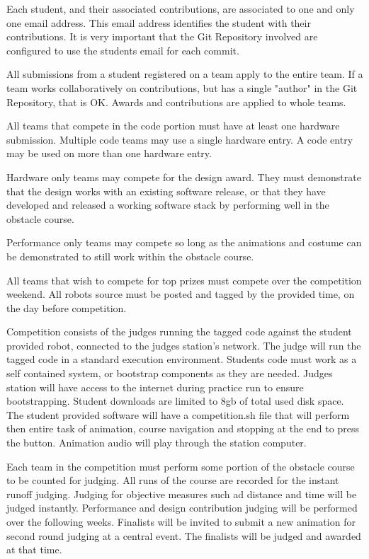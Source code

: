 \documentclass{article}
\begin{document}
Each student, and their associated contributions, are associated to one and only one email address. This email address identifies the student with their contributions. It is very important that the Git Repository involved are configured to use the students email for each commit. 

All submissions from a student registered on a team apply to the entire team. If a team works collaboratively on contributions, but has a single "author" in the Git Repository, that is OK. Awards and contributions are applied to whole teams. 

All teams that compete in the code portion must have at least one hardware submission. Multiple code teams may use a single hardware entry. A code entry may be used on more than one hardware entry. 

Hardware only teams may compete for the design award. They must demonstrate that the design works with an existing software release, or that they have developed and released a working software stack by performing well in the obstacle course. 

Performance only teams may compete so long as the animations and costume can be demonstrated to still work within the obstacle course. 

All teams that wish to compete for top prizes must compete over the competition weekend. All robots source must be posted and tagged by the provided time, on the day before competition. 

Competition consists of the judges running the tagged code against the student provided robot, connected to the judges station's network. The judge will run the tagged code in a standard execution environment. Students code must work as a self contained system, or bootstrap components as they are needed. Judges station will have access to the internet during practice run to ensure bootstrapping. Student downloads are limited to 8gb of total used disk space. The student provided software will have a competition.sh file that will perform then entire task of animation, course navigation and stopping at the end to press the button. Animation audio will play through the station computer. 

Each team in the competition must perform some portion of the obstacle course to be counted for judging. All runs of the course are recorded for the instant runoff judging. Judging for objective measures such ad distance and time will be judged instantly. Performance and design contribution judging will be performed over the following weeks. Finalists will be invited to submit a new animation for second round judging at a central event. The finalists will be judged and awarded at that time. 
\end{document}
